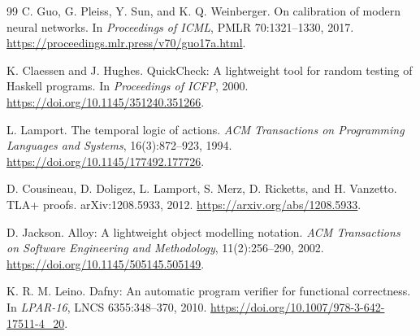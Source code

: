 \documentclass[11pt]{article}
\theoremstyle{definition}
\theoremstyle{plain}
\begin{document}
\begin{thebibliography}{99}
C. Guo, G. Pleiss, Y. Sun, and K. Q. Weinberger.
\newblock On calibration of modern neural networks.
\newblock In \emph{Proceedings of ICML}, PMLR 70:1321--1330, 2017.
\newblock \url{https://proceedings.mlr.press/v70/guo17a.html}.

K. Claessen and J. Hughes.
\newblock QuickCheck: A lightweight tool for random testing of Haskell
programs.
\newblock In \emph{Proceedings of ICFP}, 2000.
\newblock \url{https://doi.org/10.1145/351240.351266}.

L. Lamport.
\newblock The temporal logic of actions.
\newblock \emph{ACM Transactions on Programming Languages and Systems},
16(3):872--923, 1994.
\newblock \url{https://doi.org/10.1145/177492.177726}.

D. Cousineau, D. Doligez, L. Lamport, S. Merz, D. Ricketts, and H. Vanzetto.
\newblock TLA+ proofs.
\newblock arXiv:1208.5933, 2012.
\newblock \url{https://arxiv.org/abs/1208.5933}.

D. Jackson.
\newblock Alloy: A lightweight object modelling notation.
\newblock \emph{ACM Transactions on Software Engineering and Methodology},
11(2):256--290, 2002.
\newblock \url{https://doi.org/10.1145/505145.505149}.

K. R. M. Leino.
\newblock Dafny: An automatic program verifier for functional correctness.
\newblock In \emph{LPAR-16}, LNCS 6355:348--370, 2010.
\newblock \url{https://doi.org/10.1007/978-3-642-17511-4_20}.

\end{thebibliography}
\end{document}
